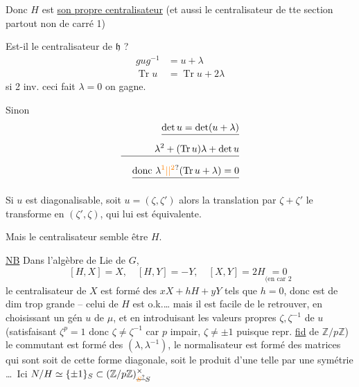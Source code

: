 Donc $H$ est \uline{son propre centralisateur} (et aussi le centralisateur de tte section partout non de carré 1)

Est-il le centralisateur de $\mathfrak h$ ?
\[
\begin{aligned}
 gug^{-1}&=u+\lambda\\
 \operatorname{Tr}u&=\operatorname{Tr}u+2\lambda
\end{aligned}
\]
si 2 inv. ceci fait $\lambda=0$ on gagne.

Sinon  
\[
\begin{aligned}
 \deleted{\det u=\det(u+\lambda)}\\
 \deleted{\phantom{\det u={}}\lambda^2+(\operatorname{Tr}u)\lambda+\det u}\\
 \deleted{\text{donc }\lambda\unsure{{}^{1}|{}|{}^{2}}(\operatorname{Tr}u+\lambda)=0}
\end{aligned}
\]

Si $u$ est diagonalisable, soit $u=(\zeta,\zeta')$ alors la translation par $\zeta+\zeta'$ le transforme en $(\zeta',\zeta)$, qui lui est équivalente.

Mais le centralisateur  semble être  $H$.

  \uline{NB} Dans l'algèbre de Lie de $G$,  
\[
 [H,X]=X,\quad [H,Y]=-Y,\quad [X,Y]=2H\underset{\text{(en car 2}}{=0}
\]
le centralisateur de $X$   est formé des $xX+hH+yY$ tels que $h=0$, donc est de dim trop grande -- celui de $H$ est o.k.\ldots
mais il est facile de le retrouver, en choisissant un gén $u$ de $\mu$, et en introduisant les valeurs propres $\zeta,\zeta^{-1}$ de $u$ (satisfaisant $\zeta^p=1$ donc $\zeta\ne\zeta^{-1}$ car $p$ impair, $\zeta\ne\pm1$  puisque repr. \uline{fid} de $\mathbb Z/p\mathbb Z$) le commutant  est formé des $(\lambda,\lambda^{-1})$, le normalisateur est formé des matrices qui sont soit de cette forme diagonale, soit le produit d'une telle par une symétrie \ldots\ Ici $N/H\simeq\{\pm1\}_S\subset(\mathbb Z/p\mathbb Z)^\times_{\deleted{\unsure{S}}S}$

